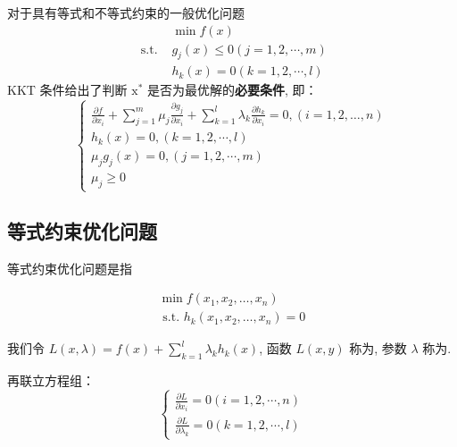 \begin{theorem}[KKT条件]
    对于具有等式和不等式约束的一般优化问题
\begin{equation}
\begin{aligned}
&\min f({x}) \\
\text { s.t. }& g_{j}({x}) \leq 0(j=1,2, \cdots, m) \\
&h_{k}({x})=0(k=1,2, \cdots, l)
\end{aligned}
\end{equation}
KKT 条件给出了判断 $ \mathrm{x}^{*} $ 是否为最优解的\textbf{必要条件}, 即：
\begin{equation}
\left\{\begin{array}{l}
\frac{\partial f}{\partial x_{i}}+\sum_{j=1}^{m} \mu_{j} \frac{\partial g_{j}}{\partial x_{i}}+\sum_{k=1}^{l} \lambda_{k} \frac{\partial h_{k}}{\partial x_{i}}=0,(i=1,2, \ldots, n) \\
h_{k}({x})=0,(k=1,2, \cdots, l) \\
\mu_{j} g_{j}({x})=0,(j=1,2, \cdots, m) \\
\mu_{j} \geq 0
\end{array}\right.
\end{equation}
\end{theorem}


\subsection{等式约束优化问题}

等式约束优化问题是指

\begin{problem}[等式约束优化问题]
    \begin{equation}
\begin{array}{l}
\min f\left(x_{1}, x_{2}, \ldots, x_{n}\right) \\
\text { s.t. } h_{k}\left(x_{1}, x_{2}, \ldots, x_{n}\right)=0
\end{array}
\end{equation}
\end{problem}


我们令 $ L({x}, \lambda)=f({x})+\sum_{k=1}^{l} \lambda_{k} h_{k}({x}) $, 函数 $ L(x, y) $ 称为, 参数 $ \lambda $ 称为.

再联立方程组： 
\begin{equation} \left\{\begin{array}{l}\frac{\partial L}{\partial x_{i}}=0(i=1,2, \cdots, n) \\ \frac{\partial L}{\partial \lambda_{k}}=0(k=1,2, \cdots, l)\end{array}\right. \end{equation}


